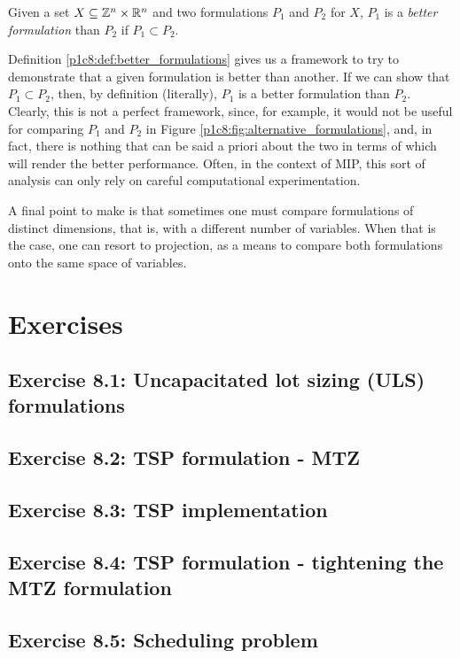 \begin{definition} \label{p1c8:def:better_formulations}
  Given a set $X\subseteq \mathbb{Z}^n\times\mathbb{R}^n$ and two formulations $P_1$ and $P_2$ for $X$, $P_1$ is a \emph{better formulation} than $P_2$ if $P_1 \subset P_2$. 
\end{definition}

Definition \ref{p1c8:def:better_formulations} gives us a framework to try to demonstrate that a given formulation is better than another. If we can show that $P_1 \subset P_2$, then, by definition (literally), $P_1$ is a better formulation than $P_2$. Clearly, this is not a perfect framework, since, for example, it would not be useful for comparing $P_1$ and $P_2$ in Figure \ref{p1c8:fig:alternative_formulations}, and, in fact, there is nothing that can be said a priori about the two in terms of which will render the better performance. Often, in the context of MIP, this sort of analysis can only rely on careful computational experimentation. 

A final point to make is that sometimes one must compare formulations of distinct dimensions, that is, with a different number of variables. When that is the case, one can resort to projection, as a means to compare both formulations onto the same space of variables. 

\section{Exercises}

\subsection*{Exercise 8.1: Uncapacitated lot sizing (ULS) formulations}


\subsection*{Exercise 8.2: TSP formulation - MTZ}


\subsection*{Exercise 8.3: TSP implementation}


\subsection*{Exercise 8.4: TSP formulation - tightening the MTZ formulation}


\subsection*{Exercise 8.5: Scheduling problem}


